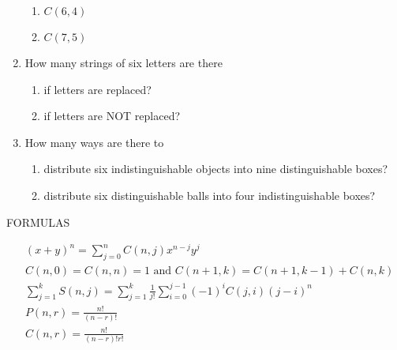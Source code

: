 \documentclass[12pt]{article}
\begin{document}
\begin{enumerate}
\begin{enumerate}
    \item $C(6, 4)$
    \item $C(7, 5)$

\end{enumerate}

\newpage



\item How many strings of six letters are there

\begin{enumerate}

    \item if letters are replaced?
    \item if letters are NOT replaced?

\end{enumerate}

\vspace{2in}

\item How many ways are there to

\begin{enumerate}

    \item distribute six indistinguishable objects into nine distinguishable boxes?
    \item distribute six distinguishable balls into four indistinguishable boxes?

\end{enumerate}

\end{enumerate} %

\newpage

\begin{center}
    FORMULAS
\end{center}

\begin{align}
    &(x+y)^{n} = \sum_{j=0}^{n} C(n, j) x^{n-j} y^{j} \\
    &C(n, 0) = C(n, n) = 1 \text{ and } C(n+1, k) = C(n+1, k-1) + C(n, k) \\
    &\sum_{j=1}^{k} S(n, j) = \sum_{j=1}^{k} \frac{1}{j!} \sum_{i=0}^{j-1} (-1)^{i} C(j, i) (j-i)^{n} \\
    &P(n, r) = \frac{n!}{(n-r)!} \\
    &C(n, r) = \frac{n!}{(n-r)! r!} \\
\end{align}
\end{document}
